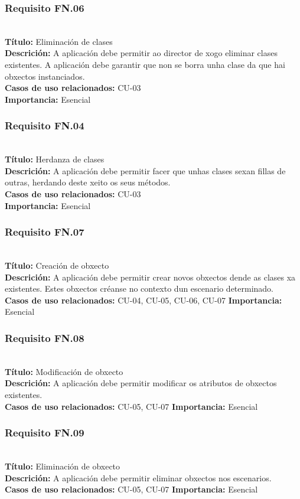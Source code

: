 \subsubsection{Requisito FN.06}~\\
{\bf Título:} Eliminación de clases\\
{\bf Descrición:} A aplicación debe permitir ao director de xogo eliminar clases
existentes. A aplicación debe garantir que non se borra unha clase da que hai
obxectos instanciados.\\
{\bf Casos de uso relacionados:} CU-03\\
{\bf Importancia:} Esencial

\subsubsection{Requisito FN.04}~\\
{\bf Título:} Herdanza de clases\\
{\bf Descrición:} A aplicación debe permitir facer que unhas clases sexan
fillas de outras, herdando deste xeito os seus métodos.\\
{\bf Casos de uso relacionados:} CU-03\\
{\bf Importancia:} Esencial

\subsubsection{Requisito FN.07}~\\
{\bf Título:} Creación de obxecto\\
{\bf Descrición:} A aplicación debe permitir crear novos obxectos dende as
clases xa existentes. Estes obxectos créanse no contexto dun escenario
determinado.\\
{\bf Casos de uso relacionados:} CU-04, CU-05, CU-06, CU-07
{\bf Importancia:} Esencial

\subsubsection{Requisito FN.08}~\\
{\bf Título:} Modificación de obxecto\\
{\bf Descrición:} A aplicación debe permitir modificar os atributos de obxectos existentes.\\
{\bf Casos de uso relacionados:} CU-05, CU-07
{\bf Importancia:} Esencial

\subsubsection{Requisito FN.09}~\\
{\bf Título:} Eliminación de obxecto\\
{\bf Descrición:} A aplicación debe permitir eliminar obxectos nos escenarios.\\
{\bf Casos de uso relacionados:} CU-05, CU-07
{\bf Importancia:} Esencial

